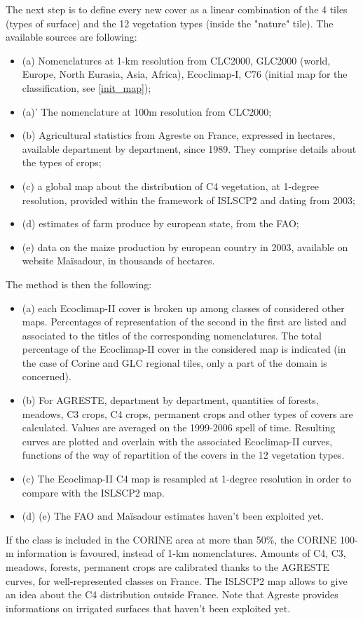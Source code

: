 The next step is to define every new cover as a linear combination of the 4 tiles (types of surface) and the 12 vegetation types (inside 
the "nature" tile). The available sources are following:
\begin{itemize}
\item{(a) Nomenclatures at 1-km resolution from CLC2000, GLC2000 (world, Europe, North Eurasia, Asia, Africa), Ecoclimap-I, C76 (initial map for the classification, see \ref{init_map});}
\item{(a)' The nomenclature at 100m resolution from CLC2000;}
\item{(b) Agricultural statistics from Agreste on France, expressed in hectares, available department by department, since 1989. They comprise 
details about the types of crops;}
\item{(c) a global map about the distribution of C4 vegetation, at 1-degree resolution, provided within the framework of ISLSCP2 and dating from 2003;}
\item{(d) estimates of farm produce by european state, from the FAO;}
\item{(e) data on the maize production by european country in 2003, available on website Ma\"{i}sadour, in thousands of hectares.}
\end{itemize}
The method is then the following:
\begin{itemize}
\item{(a) each Ecoclimap-II cover is broken up among classes of considered other maps. Percentages of representation of the second in the first 
are listed and associated to the titles of the corresponding nomenclatures. The total percentage of the Ecoclimap-II cover in the considered 
map is indicated (in the case of Corine and GLC regional tiles, only a part of the domain is concerned). }
\item{(b) For AGRESTE, department by department, quantities of forests, meadows, C3 crops, C4 crops, permanent crops and other types of covers 
are calculated. Values are averaged on the 1999-2006 spell of time. Resulting curves are plotted and overlain with the associated Ecoclimap-II 
curves, functions of the way of repartition of the covers in the 12 vegetation types.}
\item{(c) The Ecoclimap-II C4 map is resampled at 1-degree resolution in order to compare with the ISLSCP2 map.}
\item{(d) (e) The FAO and Ma\"{i}sadour estimates haven't been exploited yet. }
\end{itemize}
If the class is included in the CORINE area at more than 50\%, the CORINE 100-m information is favoured, instead of 1-km nomenclatures. Amounts of 
C4, C3, meadows, forests, permanent crops are calibrated thanks to the AGRESTE curves, for well-represented classes on France. The ISLSCP2 
map allows to give an idea about the C4 distribution outside France. Note that Agreste provides informations on irrigated surfaces that 
haven't been exploited yet.


